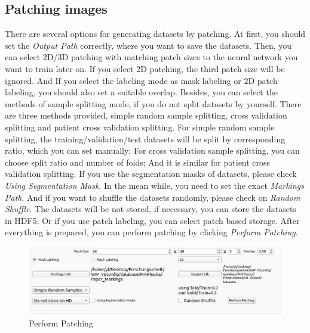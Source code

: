 \documentclass[12pt]{article}
\begin{document}
\subsection{Patching images}
There are several options for generating datasets by patching. At first, you should set the \textit{Output Path} correctly, where you want to save the datasets. Then, you can select 2D/3D patching with matching patch sizes to the neural network you want to train later on. If you select 2D patching, the third patch size will be ignored. And If you select the labeling mode as mask labeling or 2D patch labeling, you should also set a suitable overlap. Besides, you can select the methods of sample splitting mode, if you do not split datasets by yourself. There are three methods provided, simple random sample splitting, cross validation splitting and patient cross validation splitting. For simple random sample splitting, the training/validation/test datasets will be split by corresponding ratio, which you can set manually; For cross validation sample splitting, you can choose split ratio and number of folds; And it is similar for patient cross validation splitting. If you use the segmentation masks of datasets, please check \textit{Using Segmentation Mask}. In the mean while, you need to set the exact \textit{Markings Path}. And if you want to shuffle the datasets randomly, please check on \textit{Random Shuffle}. The datasets will be not stored, if necessary, you can store the datasets in HDF5. Or if you use patch labeling, you can select patch based storage. After everything is prepared, you can perform patching by clicking \textit{Perform Patching}.
\begin{figure}[htbp]	
	\centering
	\includegraphics[width=\textwidth]{perform_patching.png}
	\caption[Perform Patching]{Perform Patching}
	\label{fig:perform_patching}
\end{figure}
\end{document}
